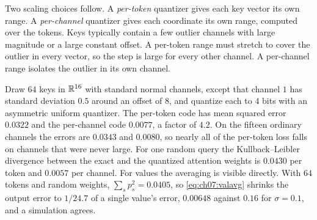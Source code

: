 Two scaling choices follow. A \emph{per-token} quantizer gives each key vector its own range. A \emph{per-channel} quantizer gives each coordinate its own range, computed over the tokens. Keys typically contain a few outlier channels with large magnitude or a large constant offset. A per-token range must stretch to cover the outlier in every vector, so the step is large for every other channel. A per-channel range isolates the outlier in its own channel.

\begin{example}\label{ex:ch07:kv}
Draw $64$ keys in $\mathbb{R}^{16}$ with standard normal channels, except that channel $1$ has standard deviation $0.5$ around an offset of $8$, and quantize each to $4$ bits with an asymmetric uniform quantizer. The per-token code has mean squared error $0.0322$ and the per-channel code $0.0077$, a factor of $4.2$. On the fifteen ordinary channels the errors are $0.0343$ and $0.0080$, so nearly all of the per-token loss falls on channels that were never large. For one random query the Kullback--Leibler divergence between the exact and the quantized attention weights is $0.0430$ per token and $0.0057$ per channel. For values the averaging is visible directly. With $64$ tokens and random weights, $\sum_sp_s^2=0.0405$, so \cref{eq:ch07:valavg} shrinks the output error to $1/24.7$ of a single value's error, $0.00648$ against $0.16$ for $\sigma=0.1$, and a simulation agrees.
\end{example}

